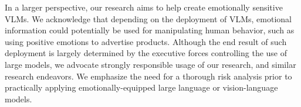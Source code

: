 In a larger perspective, our research aims to help create emotionally sensitive VLMs. We acknowledge that depending on the deployment of VLMs, emotional information could potentially be used for manipulating human behavior, such as using positive emotions to advertise products. Although the end result of such deployment is largely determined by the executive forces controlling the use of large models, we advocate strongly responsible usage of our research, and similar research endeavors. We emphasize the need for a thorough risk analysis prior to practically applying emotionally-equipped large language or vision-language models. 